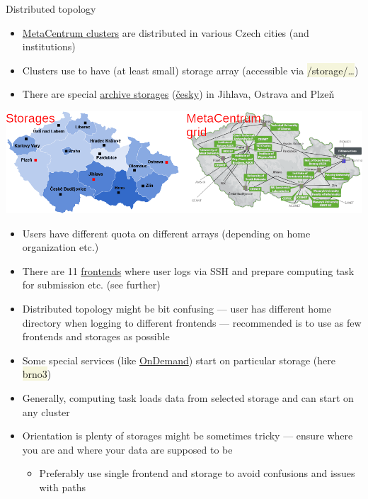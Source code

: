 \documentclass[compress, xelatex, 11pt, xcolor=svgnames, aspectratio=169,
	hyperref={
		bookmarks=true,
		unicode=true,
		colorlinks=true,
		pdftitle={Linux, command line and MetaCentrum},
		plainpages=false,
		pdfauthor={Vojtech Zeisek},
		pdfsubject={Course about use of Linux command line, writing shell scripts and using MetaCentrum of CESNET},
		pdfcreator={XeLaTeX},
		pdfkeywords={Linux, GNU, BASH, shell, command line, MetaCentrum},
		linkcolor=DarkRed, %
		anchorcolor=DarkBlue, %
		citecolor=Indigo, %
		filecolor=NavyBlue, %
		menucolor=DarkMagenta, %
		urlcolor=DarkBlue, %
		},
	url={hyphens, lowtilde} %
	]{beamer}
\renewcommand{\texttt}[1]{\colorbox{Beige}{{\ttfamily #1}}}
\begin{document}
\begin{frame}[allowframebreaks]{Distributed topology}
	\begin{itemize}
		\item \href{https://metavo.metacentrum.cz/}{MetaCentrum clusters} are distributed in various Czech cities (and institutions)
		\item Clusters use to have (at least small) storage array (accessible via \texttt{/storage/\ldots})
		\item There are special \href{https://du.cesnet.cz/en/infrastruktura_ulozist/start}{archive storages} (\href{https://du.cesnet.cz/cs/infrastruktura_ulozist/start}{česky}) in Jihlava, Ostrava and Plzeň
	\end{itemize}
	\begin{center}
		\includegraphics[width=\textwidth]{metacentrum_map.png}
	\end{center}
	\begin{itemize}
		\item Users have different quota on different arrays (depending on home organization etc.)
		\item There are 11 \href{https://docs.metacentrum.cz/computing/frontends/}{frontends} where user logs via SSH and prepare computing task for submission etc. (see further)
		\item Distributed topology might be bit confusing --- user has different home directory when logging to different frontends --- recommended is to use as few frontends and storages as possible
		\item Some special services (like \href{https://docs.metacentrum.cz/software/ondemand/}{OnDemand}) start on particular storage (here \texttt{brno3})
		\item Generally, computing task loads data from selected storage and can start on any cluster
		\item Orientation is plenty of storages might be sometimes tricky --- ensure where you are and where your data are supposed to be
		\begin{itemize}
			\item Preferably use single frontend and storage to avoid confusions and issues with paths
		\end{itemize}
	\end{itemize}
\end{frame}
\end{document}
